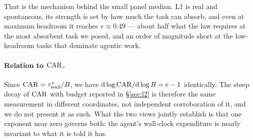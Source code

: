That is the mechanism behind the small panel median. L1 is real and
spontaneous, its strength is set by how much the task can absorb, and even at
maximum headroom it reaches $e \approx 0.49$ --- about half what the law
requires at the most absorbent task we posed, and an order of magnitude short
at the low-headroom tasks that dominate agentic work.

\paragraph{Relation to $\mathrm{CAR}$.} Since $\mathrm{CAR} = \tau_{\mathrm{wall}}^{*}/B$, we have
$\mathrm{d}\log \mathrm{CAR} / \mathrm{d}\log B = e - 1$ identically. The steep
decay of $\mathrm{CAR}$ with budget reported in \S\ref{sec:l2} is therefore the same
measurement in different coordinates, not independent corroboration of it, and
we do not present it as such. What the two views jointly establish is that one
exponent near zero governs both: the agent's wall-clock expenditure is nearly
invariant to what it is told it has.
